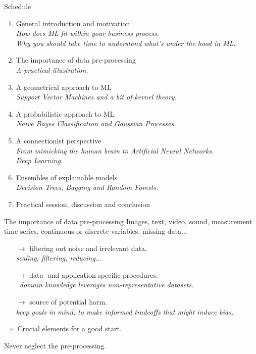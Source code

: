 \documentclass{beamer}
\begin{document}
\begin{frame}{Schedule}
\begin{enumerate}
\item General introduction and motivation \Checkmark \\
{\small \it How does ML fit within your business process.\\
Why you should take time to understand what's under the hood in ML.}
\item The importance of data pre-processing\\
{\small \it A practical illustration.}
\item A geometrical approach to ML\\
{\small \it Support Vector Machines and a bit of kernel theory.}
\item A probabilistic approach to ML\\
{\small \it Naive Bayes Classification and Gaussian Processes.}
\item A connectionist perspective \\
{\small \it From mimicking the human brain to Artificial Neural Networks.\\
Deep Learning.}
\item Ensembles of explainable models\\
{\small \it Decision Trees, Bagging and Random Forests.}
\item Practical session, discussion and conclusion
\end{enumerate}
\end{frame}

\begin{frame}{The importance of data pre-processing}
Images, text, video, sound, measurement time series, continuous or discrete variables, missing data...
\begin{itemize}
\item[$\rightarrow$] filtering out noise and irrelevant data.\\%
{\small \it scaling, filtering, reducing...}
\item[$\rightarrow$] data- and application-specific procedures.\\%
{\small \it domain knowledge leverages non-representative datasets.}
\item[$\rightarrow$] source of potential harm.\\%
{\small \it keep goals in mind, to make informed tradeoffs that might induce bias.}
\end{itemize}
$\Rightarrow$ Crucial elements for a good start.
\begin{center}
Never neglect the pre-processing.
\end{center}
\end{frame}
\end{document}
